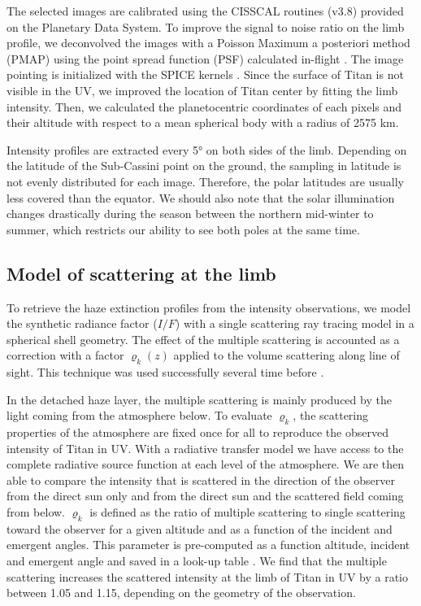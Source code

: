 The selected images are calibrated using the CISSCAL routines (v3.8) provided on the Planetary Data System. To improve
the signal to noise ratio on the limb profile, we deconvolved the images with a Poisson Maximum a posteriori method
(PMAP) using the point spread function (PSF) calculated in-flight \citep{West2010}. The image pointing is
initialized with the SPICE kernels \citep{Acton1996, Annex2017}. Since the surface of Titan is not visible in the UV, we improved
the location of Titan center by fitting the limb intensity. Then, we calculated the planetocentric coordinates of each
pixels and their altitude with respect to a mean spherical body with a radius of 2575 km.

Intensity profiles are extracted every \ang{5} on both sides of the limb. Depending on the
latitude of the Sub-Cassini point on the ground, the sampling in latitude is not evenly distributed for each image.
Therefore, the polar latitudes are usually less covered than the equator.
We should also note that the solar illumination changes drastically during the
season between the northern mid-winter to summer, which restricts our ability to see both poles at the same time.


\subsection{Model of scattering at the limb}

To retrieve the haze extinction profiles from the intensity observations, we model the synthetic
radiance factor ($I/F$) with a single scattering ray tracing model in a spherical shell geometry.
The effect of the multiple scattering is accounted as a correction with a factor $\varrho_k\left(z\right)$
applied to the volume scattering along line of sight.
This technique was used successfully several time before \citep[e.g.][]{Rages1983, Rannou1997, Seignovert2017, West2018}.

In the detached haze layer, the multiple scattering is mainly produced by the light coming from the atmosphere below. To
evaluate $\varrho_k$, the scattering properties of the atmosphere are fixed once for all to
reproduce the observed intensity of Titan in UV. With a radiative transfer model \citep[SHDOMPP, from ][]{Evans1998}
we have access to the complete radiative source function at each level of the atmosphere. We are then able to compare the
intensity that is scattered in the direction of the observer from the direct sun only and from the direct sun and the scattered
field coming from below. $\varrho_k$ is defined as the ratio of multiple scattering to single scattering toward the observer
for a given altitude and as a function of the incident and emergent angles. This parameter is pre-computed as a function
altitude, incident and emergent angle and saved in a look-up table \citep[see.][for details]{West2018}.
We find that the multiple scattering increases the scattered intensity at the limb of Titan in UV by a ratio between
1.05 and 1.15, depending on the geometry of the observation.

